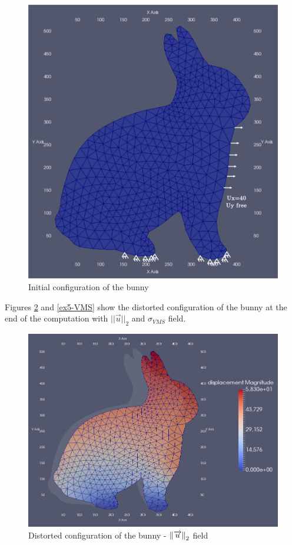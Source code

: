 \documentclass[oneside,11pt,times]{book}
\begin{document}
\begin{figure}[h!]
    \centering
    \includegraphics[scale=0.18]{imgs/Examples/ex5-BC.png}
    \caption{Initial configuration of the bunny}
    \label{ex5-BC}
\end{figure}

Figures \ref{ex5-disp} and \ref{ex5-VMS} show the distorted configuration of the bunny at the end of the computation with $||\overrightarrow{u}||_2$ and $\sigma_{VMS}$ field.

\begin{figure}[h!]
    \centering
    \includegraphics[scale=0.381]{imgs/Examples/ex5-disp.png}
    \caption{Distorted configuration of the bunny - $\left \lVert \protect\overrightarrow{u} \right \rVert_2$ field}
    \label{ex5-disp}
\end{figure}
\end{document}
